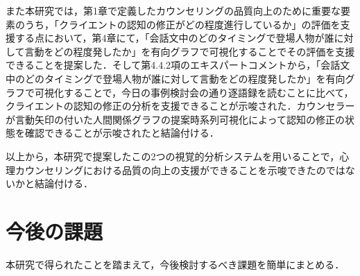 \documentclass[shuuron]{kuee}
\begin{document}





また本研究では，第1章で定義したカウンセリングの品質向上のために重要な要素のうち，「クライエントの認知の修正がどの程度進行しているか」の評価を支援する点において，第4章にて，「会話文中のどのタイミングで登場人物が誰に対して言動をどの程度発したか」を有向グラフで可視化することでその評価を支援できることを提案した．そして第4.4.2項のエキスパートコメントから，「会話文中のどのタイミングで登場人物が誰に対して言動をどの程度発したか」を有向グラフで可視化することで，今日の事例検討会の通り逐語録を読むことに比べて，クライエントの認知の修正の分析を支援できることが示唆された．カウンセラーが言動矢印の付いた人間関係グラフの提案時系列可視化によって認知の修正の状態を確認できることが示唆されたと結論付ける．

以上から，本研究で提案したこの2つの視覚的分析システムを用いることで，心理カウンセリングにおける品質の向上の支援ができることを示唆できたのではないかと結論付ける．%


\section{今後の課題}

本研究で得られたことを踏まえて，今後検討するべき課題を簡単にまとめる．
\end{document}
